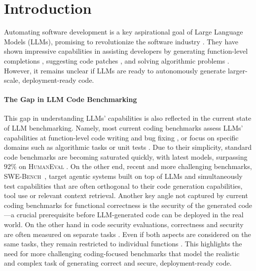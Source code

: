 
\section{Introduction} \label{sec:intro}

Automating software development is a key aspirational goal of Large Language Models (LLMs), promising to revolutionize the software industry \citep{lyu2024automatic}.
They have shown impressive capabilities in assisting developers by generating function-level completions \citep{humaneval,austin2021program_mbpp}, suggesting code patches \citep{swebench}, and solving algorithmic problems \citep{apps}. However, it remains unclear if LLMs are ready to autonomously generate larger-scale, deployment-ready code.

\paragraph{The Gap in LLM Code Benchmarking}
This gap in understanding LLMs' capabilities is also reflected in the current state of LLM benchmarking.
Namely, most current coding benchmarks assess LLMs' capabilities at function-level code writing and bug fixing \citep{humaneval,austin2021program_mbpp,muennighoff2023octopack}, or focus on specific domains such as algorithmic tasks or unit tests \citep{apps,mundler2024swtbench}.
Due to their simplicity, standard code benchmarks are becoming saturated quickly, with latest models, \eg \claudesonnet{} surpassing $92\%$ on \textsc{HumanEval} \citep{humaneval,anthropic2025claude35}.
On the other end, recent and more challenging benchmarks, \eg \textsc{SWE-Bench}~\citep{swebench}, target agentic systems built on top of LLMs and simultaneously test capabilities that are often orthogonal to their code generation capabilities, \eg tool use or relevant context retrieval.
Another key angle not captured by current coding benchmarks for functional correctness is the security of the generated code---a crucial prerequisite before LLM-generated code can be deployed in the real world.
On the other hand in code security evaluations, correctness and security are often measured on separate tasks \citep{pearce2022asleep,cyberseceval,safecoder,jenko2024practicalattacksblackboxcode}. Even if both aspects are considered on the same tasks, they remain restricted to individual functions \citep{seccodeplt,cweval}. 
This highlights the need for more challenging coding-focused benchmarks that model the realistic and complex task of generating correct and secure, deployment-ready code. 

